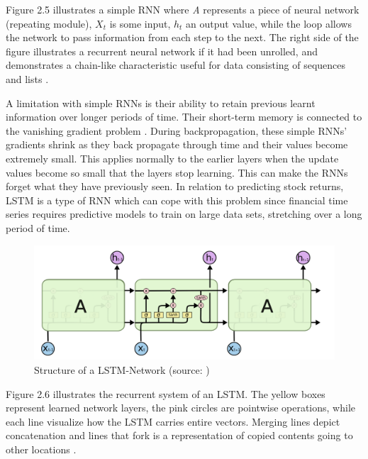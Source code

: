 \indent\newline 
Figure 2.5 illustrates a simple RNN where \textit{A} represents a piece of neural network (repeating module), $X_{t}$ is some input, $h_{t}$ an output value, while the loop allows the network to pass information from each step to the next. The right side of the figure illustrates a recurrent neural network if it had been unrolled, and demonstrates a chain-like characteristic useful for data consisting of sequences and lists \cite{olah}.    

\indent\newline 
A limitation with simple RNNs is their ability to retain previous learnt information over longer periods of time. Their short-term memory is connected to the vanishing gradient problem \cite{phi}. During backpropagation, these simple RNNs' gradients shrink as they back propagate through time and their values become extremely small. This applies normally to the earlier layers when the update values become so small that the layers stop learning. This can make the RNNs forget what they have previously seen. In relation to predicting stock returns, LSTM is a type of RNN which can cope with this problem since financial time series requires predictive models to train on large data sets, stretching over a long period of time. 
\indent\newline 
\begin{figure}[H]
\centering
\includegraphics [scale=0.40,angle=360]{figures/lstm.png}
\caption{Structure of a LSTM-Network (source: \cite{olah})}
\label{fig:lstm}
\end{figure}

\indent\newline 
Figure 2.6 illustrates the recurrent system of an LSTM. The yellow boxes represent learned network layers, the pink circles are pointwise operations, while each line visualize how the LSTM carries entire vectors. Merging lines depict concatenation and lines that fork is a representation of copied contents going to other locations \cite{olah}. 

